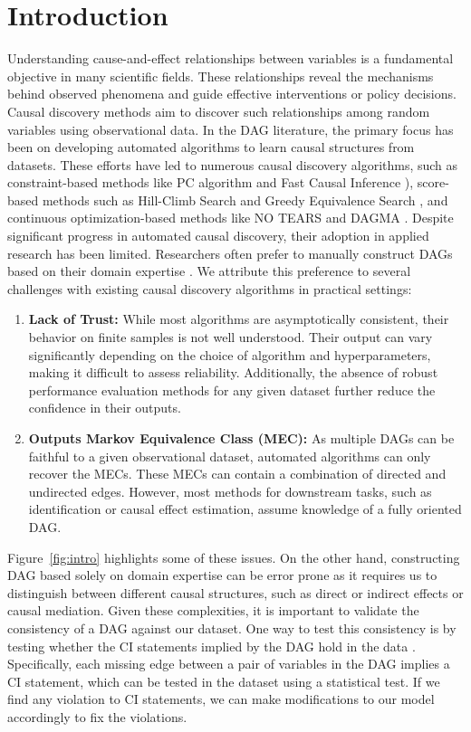 \documentclass{uai2025} %
\begin{document}
\section{Introduction}
Understanding cause-and-effect relationships between variables is a fundamental
objective in many scientific fields. These relationships reveal the mechanisms
behind observed phenomena and guide effective interventions or policy
decisions. Causal discovery methods aim to discover such relationships among
random variables using observational data. In the DAG literature, the primary
focus has been on developing automated algorithms to learn causal structures
from datasets. These efforts have led to numerous causal discovery algorithms,
such as constraint-based methods like PC algorithm \citep{Spirtes2001} and Fast
Causal Inference \citep{Spirtes2000}), score-based methods such as Hill-Climb
Search and Greedy Equivalence Search \citep{Chickering2002}, and continuous
optimization-based methods like NO TEARS \citep{Zheng2018} and DAGMA
\citep{Bello2022}. Despite significant progress in automated causal discovery,
their adoption in applied research has been limited. Researchers often prefer
to manually construct DAGs based on their domain expertise \citep{Tennant2020,
Petersen2021}. We attribute this preference to several challenges with existing
causal discovery algorithms in practical settings:

\begin{enumerate}
	\item \textbf{Lack of Trust:} While most algorithms are asymptotically
		consistent, their behavior on finite samples is not well
		understood. Their output can vary significantly depending on
		the choice of algorithm and hyperparameters, making it
		difficult to assess reliability. Additionally, the absence of
		robust performance evaluation methods for any given dataset
		further reduce the confidence in their outputs. 
	\item \textbf{Outputs Markov Equivalence Class (MEC):} As multiple
		DAGs can be faithful to a given observational dataset, automated 
		algorithms can only recover the MECs. These MECs can contain a
		combination of directed and undirected edges. However, most
		methods for downstream tasks, such as identification or causal
		effect estimation, assume knowledge of a fully oriented DAG. 
\end{enumerate}

Figure~\ref{fig:intro} highlights some of these issues. On the other hand,
constructing DAG based solely on domain expertise can be error prone as it
requires us to distinguish between different causal structures, such as direct
or indirect effects or causal mediation. Given these complexities, it is
important to validate the consistency of a DAG against our dataset. One way to
test this consistency is by testing whether the CI statements implied by the
DAG hold in the data \citep{Ankan2021}. Specifically, each missing edge between
a pair of variables in the DAG implies a CI statement, which can be tested in
the dataset using a statistical test. If we find any violation to CI
statements, we can make modifications to our model accordingly to fix the
violations. 
\end{document}
